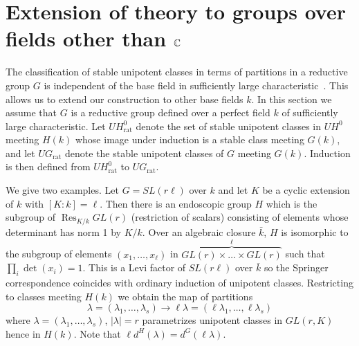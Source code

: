 \documentclass{amsart}
\newcommand\C		{{\Bbb C}}
\newcommand\lam	{\lambda}
\newcommand\UHo	{UH^0}
\begin{document}

\section{Extension of theory to groups over fields other
than $\C$} %

\bigskip

The classification of stable unipotent classes in terms of
partitions in a
reductive group $G$ is independent of the base field in
sufficiently large
characteristic~\cites{Sp,C}.  This allows us to extend our
construction 
to other base fields
$k$.  In this section we assume that $G$ is a reductive group
defined over a 
perfect field $k$ of sufficiently large characteristic.  Let 
$UH_{\text{rat}}^0$ denote 
the set of stable unipotent classes in $\UHo$ meeting $H(k)$ 
whose image
under induction is a stable class meeting $G(k)$, and let
$UG_{\text{rat}}$
denote the stable unipotent classes of $G$ meeting $G(k)$. 
Induction is
then defined from $UH_{\text{rat}}^0$ to $UG_{\text{rat}}$.

We give two examples.  Let $G = SL(r\ell)$ over $k$ and let $K$
be a cyclic 
extension
of $k$ with $[K:k] = \ell$.  Then there is an endoscopic group
$H$ which
is the subgroup of $\operatorname{Res}_{K/k} GL(r)$ (restriction
of scalars)
consisting of elements whose determinant has norm 1 by $K/k$. 
Over
an algebraic closure $\bar k$, $H$ is isomorphic to the subgroup
of 
elements $(x_1 ,\dots, x_\ell)$
in $\overbrace{GL(r) \times\dots\times GL(r)}^\ell$ such that
$\prod_i \det(x_i) = 1$.  This is a Levi factor of $SL(r\ell)$
over $\bar k$ 
so the Springer
correspondence coincides with ordinary induction of unipotent
classes.
Restricting to classes meeting $H(k)$ we obtain the map of
partitions
     $$
     \lam = (\lam_1 ,\dots, \lam_s) \longrightarrow 
     \ell\lam = (\ell\lam_1 ,\dots, \ell\lam_s)
     $$
where $\lam = (\lam_1 ,\dots, \lam_s)$, $|\lam| = r$ parametrizes
unipotent
classes in $GL(r,K)$ hence in $H(k)$.  Note that 
$\ell d^H(\lam) = d^G(\ell\lam)$.
\end{document}
